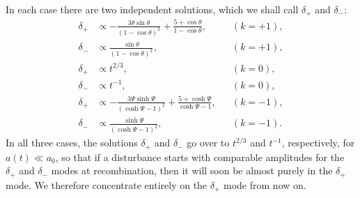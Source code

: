 In each case there are two independent solutions, which we shall call
\(\delta_+\) and \(\delta_-\):
\begin{align}
  \delta_+
  &\propto
  -\frac{3\theta\sin\theta}{(1-\cos\theta)^2}
  +\frac{5+\cos\theta}{1-\cos\theta},
  &&(k=+1),
  \tag{15.9.27}\label{eq:15.9.27}\\
  \delta_-
  &\propto
  \frac{\sin\theta}{(1-\cos\theta)^2},
  &&(k=+1),
  \tag{15.9.28}\label{eq:15.9.28}\\
  \delta_+
  &\propto t^{2/3},
  &&(k=0),
  \tag{15.9.29}\label{eq:15.9.29}\\
  \delta_-
  &\propto t^{-1},
  &&(k=0),
  \tag{15.9.30}\label{eq:15.9.30}\\
  \delta_+
  &\propto
  -\frac{3\Psi\sinh\Psi}{(\cosh\Psi-1)^2}
  +\frac{5+\cosh\Psi}{\cosh\Psi-1},
  &&(k=-1),
  \tag{15.9.31}\label{eq:15.9.31}\\
  \delta_-
  &\propto
  \frac{\sinh\Psi}{(\cosh\Psi-1)^2},
  &&(k=-1).
  \tag{15.9.32}\label{eq:15.9.32}
\end{align}
In all three cases, the solutions \(\delta_+\) and \(\delta_-\) go over to
\(t^{2/3}\) and \(t^{-1}\), respectively, for \(a(t)\ll a_0\), so that if
a disturbance starts with comparable amplitudes for the \(\delta_+\) and
\(\delta_-\) modes at recombination, then it will soon be almost purely in
the \(\delta_+\) mode. We therefore concentrate entirely on the
\(\delta_+\) mode from now on.

